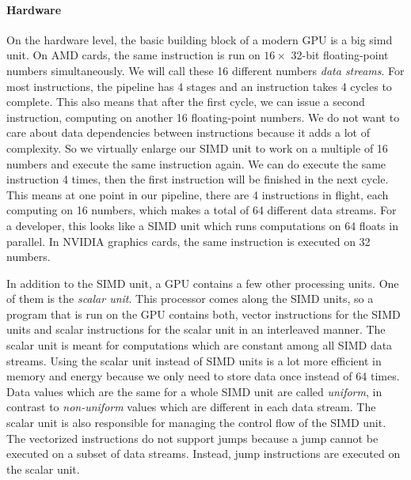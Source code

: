 \paragraph{Hardware} On the hardware level, the basic building block of a modern GPU is a big \gls{simd} unit. On AMD cards, the same instruction is run on $16 \times$ 32-bit floating-point numbers simultaneously. We will call these 16 different numbers \emph{data streams}. For most instructions, the pipeline has 4 stages and an instruction takes 4 cycles to complete. This also means that after the first cycle, we can issue a second instruction, computing on another 16 floating-point numbers. We do not want to care about data dependencies between instructions because it adds a lot of complexity. So we virtually enlarge our SIMD unit to work on a multiple of 16 numbers and execute the same instruction again. We can do execute the same instruction 4 times, then the first instruction will be finished in the next cycle. This means at one point in our pipeline, there are 4 instructions in flight, each computing on 16 numbers, which makes a total of 64 different data streams. For a developer, this looks like a SIMD unit which runs computations on 64 floats in parallel. In NVIDIA graphics cards, the same instruction is executed on 32 numbers.

In addition to the SIMD unit, a GPU contains a few other processing units. One of them is the \emph{scalar unit}. This processor comes along the SIMD units, so a program that is run on the GPU contains both, vector instructions for the SIMD units and scalar instructions for the scalar unit in an interleaved manner. The scalar unit is meant for computations which are constant among all SIMD data streams. Using the scalar unit instead of SIMD units is a lot more efficient in memory and energy because we only need to store data once instead of 64 times. Data values which are the same for a whole SIMD unit are called \emph{uniform}, in contrast to \emph{non-uniform} values which are different in each data stream. The scalar unit is also responsible for managing the control flow of the SIMD unit. The vectorized instructions do not support jumps because a jump cannot be executed on a subset of data streams. Instead, jump instructions are executed on the scalar unit.

